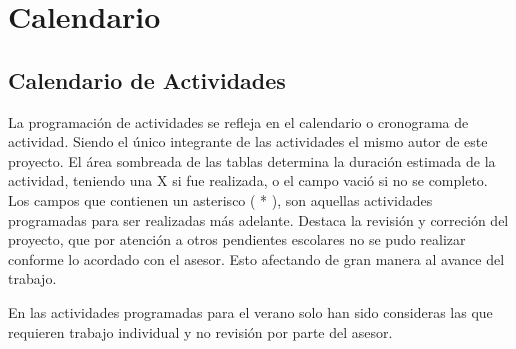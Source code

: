 
\chapter{Calendario} %

\ifpdf
    \graphicspath{{4/figures/PNG/}{4/figures/PDF/}{4/figures/}}
\else
    \graphicspath{{4/figures/EPS/}{4/figures/}}
\fi

\section{Calendario de Actividades}

La programaci\'{o}n de actividades se refleja en el calendario o cronograma de actividad. Siendo el \'{u}nico integrante de las actividades el mismo autor de este proyecto. El \'{a}rea sombreada de las tablas determina la duraci\'{o}n estimada de la actividad, teniendo una X si fue realizada, o el campo vaci\'{o} si no se completo. Los campos que contienen un asterisco ( * ), son aquellas actividades programadas para  ser realizadas m\'{a}s adelante.
Destaca la revisi\'{o}n y correci\'{o}n del proyecto, que por atenci\'{o}n a otros pendientes escolares no se pudo realizar conforme lo acordado con el asesor. Esto afectando de gran manera al avance del trabajo.


En las actividades programadas para el verano solo han sido consideras las que requieren trabajo individual y no revisi\'{o}n por parte del asesor.







